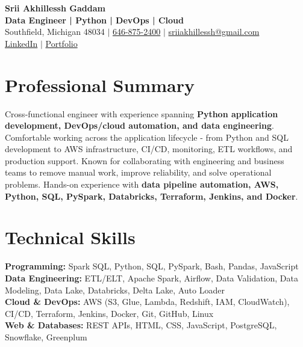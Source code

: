 \documentclass[letterpaper,10pt]{article}
\begin{document}
\fontsize{9.35pt}{10.45pt}\selectfont

\begin{center}
    {\LARGE \textbf{Srii Akhillessh Gaddam}} \\[-1pt]
    \textbf{Data Engineer | Python | DevOps | Cloud} \\[2pt]
    Southfield, Michigan 48034 $|$
    \href{tel:6468752400}{646-875-2400} $|$
    \href{mailto:sriiakhillessh@gmail.com}{sriiakhillessh@gmail.com} \\[1pt]
    \href{https://www.linkedin.com/in/srii-akhiilessh-gaddam-b48668191/}{LinkedIn} $|$
    \href{https://sriiakhillesshg.github.io/portfolio/}{Portfolio}
\end{center}
\vspace{-8pt}

\section{Professional Summary}
\small{Cross-functional engineer with experience spanning \textbf{Python application development, DevOps/cloud automation, and data engineering}. Comfortable working across the application lifecycle - from Python and SQL development to AWS infrastructure, CI/CD, monitoring, ETL workflows, and production support. Known for collaborating with engineering and business teams to remove manual work, improve reliability, and solve operational problems. Hands-on experience with \textbf{data pipeline automation, AWS, Python, SQL, PySpark, Databricks, Terraform, Jenkins, and Docker}.}

\section{Technical Skills}
\small{
\textbf{Programming:} Spark SQL, Python, SQL, PySpark, Bash, Pandas, JavaScript \\
\textbf{Data Engineering:} ETL/ELT, Apache Spark, Airflow, Data Validation, Data Modeling, Data Lake, Databricks, Delta Lake, Auto Loader \\
\textbf{Cloud \& DevOps:} AWS (S3, Glue, Lambda, Redshift, IAM, CloudWatch), CI/CD, Terraform, Jenkins, Docker, Git, GitHub, Linux \\
\textbf{Web \& Databases:} REST APIs, HTML, CSS, JavaScript, PostgreSQL, Snowflake, Greenplum
}
\end{document}

